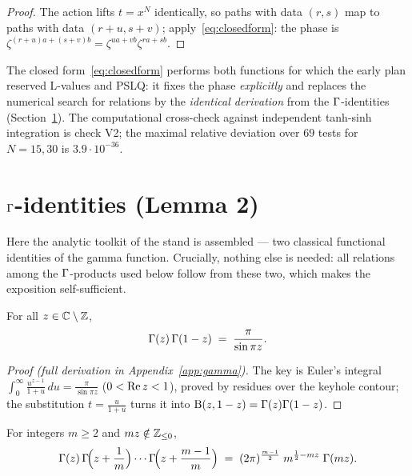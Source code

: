 \begin{proof}
The action lifts $t=x^N$ identically, so paths with data $(r,s)$ map
to paths with data $(r+u,s+v)$; apply~\eqref{eq:closedform}: the
phase is $\zeta^{(r+u)a+(s+v)b}=\zeta^{ua+vb}\zeta^{ra+sb}$.
\end{proof}

\begin{remark}
The closed form~\eqref{eq:closedform} performs both functions for
which the early plan reserved L-values and PSLQ: it fixes the phase
\emph{explicitly} and replaces the numerical search for relations by
the \emph{identical derivation} from the $\Gamma$-identities
(Section~\ref{sec:gammaid}). The computational cross-check against
independent tanh-sinh integration is check V2; the maximal relative
deviation over $69$ tests for $N=15,30$ is $3.9\cdot10^{-36}$.
\end{remark}

\section{$\Gamma$-identities (Lemma 2)}\label{sec:gammaid}

Here the analytic toolkit of the stand is assembled --- two classical
functional identities of the gamma function. Crucially, nothing else
is needed: all relations among the $\Gamma$-products used below follow
from these two, which makes the exposition self-sufficient.

\begin{lemma}\label{lem:reflection}
For all $z\in\mathbb{C}\setminus\mathbb{Z}$,
\begin{equation}\label{eq:reflection}
  \Gamma(z)\,\Gamma(1-z)\;=\;\frac{\pi}{\sin \pi z}.
\end{equation}
\end{lemma}

\begin{proof}[Proof (full derivation in Appendix~\ref{app:gamma})]
The key is Euler's integral
$\int_0^\infty \frac{u^{z-1}}{1+u}\,du = \frac{\pi}{\sin\pi z}$
($0<\operatorname{Re} z<1$), proved by residues over the keyhole contour; the
substitution $t=\frac{u}{1+u}$ turns it into
$\mathrm{B}(z,1-z)=\Gamma(z)\Gamma(1-z)$.
\end{proof}

\begin{lemma}\label{lem:gauss}
For integers $m\ge2$ and $mz\notin\mathbb{Z}_{\le0}$,
\begin{equation}\label{eq:gauss}
  \Gamma(z)\,\Gamma\!\Bigl(z+\frac1m\Bigr)\cdots
  \Gamma\!\Bigl(z+\frac{m-1}{m}\Bigr)
  \;=\;(2\pi)^{\frac{m-1}{2}}\;m^{\frac12-mz}\;\Gamma(mz).
\end{equation}
\end{lemma}

